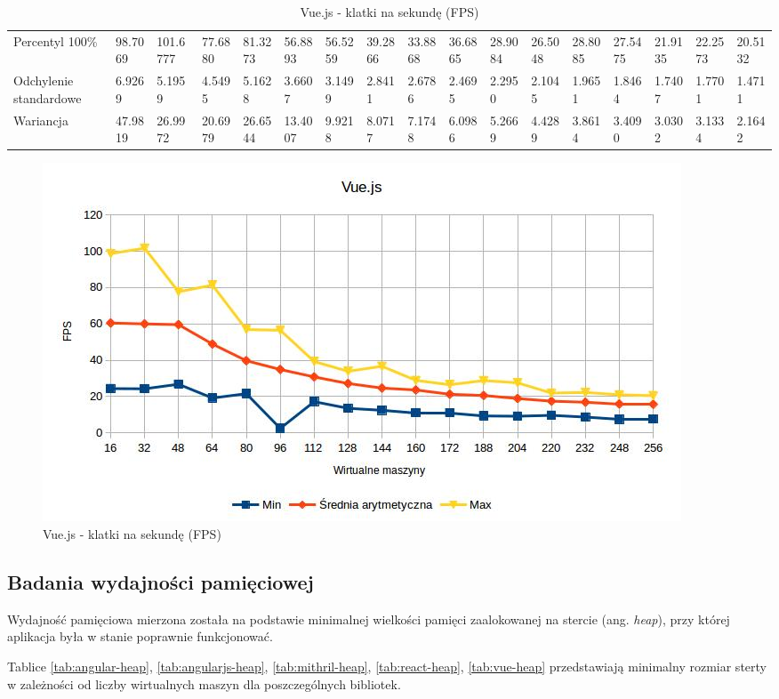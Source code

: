 \documentclass[polish, twoside, 12pt]{mwart}
\begin{document}
\begin{table}[]
{\begin{tabular}{@{}lllllllllllllllll@{}}
  Percentyl 100\%        & 98.7069 & 101.6777 & 77.6880 & 81.3273 & 56.8893 & 56.5259 & 39.2866 & 33.8868 & 36.6865 & 28.9084 & 26.5048 & 28.8085 & 27.5475 & 21.9135 & 22.2573 & 20.5132 \\
  Odchylenie standardowe & 6.9269  & 5.1959   & 4.5495  & 5.1628  & 3.6607  & 3.1499  & 2.8411  & 2.6786  & 2.4695  & 2.2950  & 2.1045  & 1.9651  & 1.8464  & 1.7407  & 1.7701  & 1.4711  \\
  Wariancja              & 47.9819 & 26.9972  & 20.6979 & 26.6544 & 13.4007 & 9.9218  & 8.0717  & 7.1748  & 6.0986  & 5.2669  & 4.4289  & 3.8614  & 3.4090  & 3.0302  & 3.1334  & 2.1642  \\ \bottomrule
  \end{tabular}%
  }
  \caption{Vue.js - klatki na sekundę (FPS)}
  \label{tab:vue-fps}
\end{table}

\begin{figure}[ht]
  \includegraphics[width=\textwidth]{vue-fps.jpg}
  \caption{Vue.js - klatki na sekundę (FPS)}
  \label{fig:vue-fps}
\end{figure}

\subsection{Badania wydajności pamięciowej}

Wydajność pamięciowa mierzona została na podstawie minimalnej wielkości pamięci zaalokowanej na stercie (ang. \emph{heap}), przy której aplikacja była w stanie poprawnie funkcjonować.

Tablice \ref{tab:angular-heap}, \ref{tab:angularjs-heap}, \ref{tab:mithril-heap}, \ref{tab:react-heap}, \ref{tab:vue-heap} przedstawiają minimalny rozmiar sterty w zależności od liczby wirtualnych maszyn dla poszczególnych bibliotek.
\end{document}
